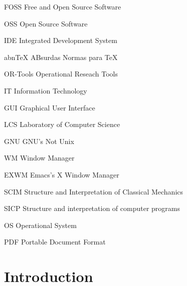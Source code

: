 \documentclass[
12pt,				%
openright,			%
oneside,			%
a4paper,			%
brazil,				%
english,			  %
]{abntex2}
\begin{document}
\begin{siglas}
\item[FOSS] Free and Open Source Software
\item[OSS] Open Source Software
\item[IDE] Integrated Development System 
\item[abnTeX] ABsurdas Normas para TeX
\item[OR-Tools] Operational Reseach Tools
\item[IT] Information Technology
\item[GUI] Graphical User Interface
\item[LCS] Laboratory of Computer Science
\item[GNU] GNU's Not Unix
\item[WM] Window Manager
\item[EXWM] Emacs's X Window Manager
\item[SCIM] Structure and Interpretation of Classical Mechanics
\item[SICP]Structure and interpretation of computer programs
\item[OS] Operational System
\item[PDF] Portable Document Format
\end{siglas}


\tableofcontents*
\cleardoublepage



\textual


\chapter[Introduction]{Introduction}
\end{document}
